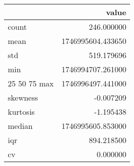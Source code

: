 \begin{tabular}{lr}
\toprule
 & value \\
\midrule
count & 246.000000 \\
mean & 1746995604.433650 \\
std & 519.179696 \\
min & 1746994707.261000 \\
25%
50%
75%
max & 1746996497.441000 \\
skewness & -0.007209 \\
kurtosis & -1.195438 \\
median & 1746995605.853000 \\
iqr & 894.218500 \\
cv & 0.000000 \\
\bottomrule
\end{tabular}
